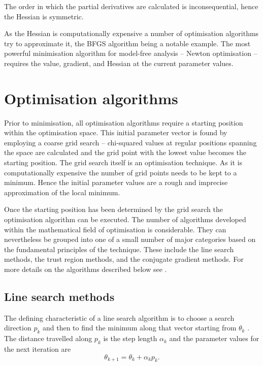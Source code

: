 \noindent The order in which the partial derivatives are calculated is inconsequential, hence the Hessian is symmetric.

As the Hessian is computationally expensive a number of optimisation algorithms try to approximate it, the BFGS algorithm being a notable example.
The most powerful minimisation algorithm for model-free analysis -- Newton optimisation -- requires the value, gradient, and Hessian at the current parameter values.




\section{Optimisation algorithms}

Prior to minimisation, all optimisation algorithms require a starting position within the optimisation space.  This initial parameter vector is found by employing a coarse grid search -- chi-squared values at regular positions spanning the space are calculated and the grid point with the lowest value becomes the starting position.  The grid search itself is an optimisation technique.  As it is computationally expensive the number of grid points needs to be kept to a minimum.  Hence the initial parameter values are a rough and imprecise approximation of the local minimum.

Once the starting position has been determined by the grid search the optimisation algorithm can be executed.  The number of algorithms developed within the mathematical field of optimisation is considerable.  They can nevertheless be grouped into one of a small number of major categories based on the fundamental principles of the technique.  These include the line search methods, the trust region methods, and the conjugate gradient methods.  For more details on the algorithms described below see \citet{NocedalWright99}.




\subsection{Line search methods}

The defining characteristic of a line search algorithm is to choose a search direction $p_k$ and then to find the minimum along that vector starting from $\theta_k$ \citep{NocedalWright99}.  The distance travelled along $p_k$ is the step length $\alpha_k$ and the parameter values for the next iteration are
\begin{equation}
 \theta_{k+1} = \theta_k + \alpha_k p_k.
\end{equation}

